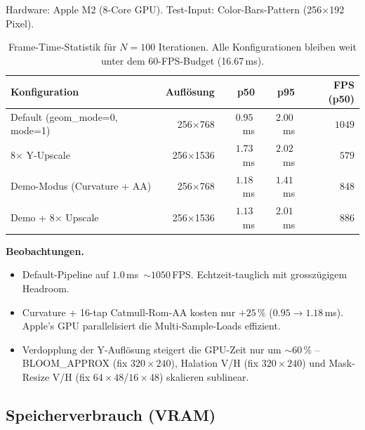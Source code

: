 \documentclass[11pt, a4paper]{article}
\newcommand{\tableheadercolor}{\rowcolor{hkared}}
\newcommand{\thw}[1]{\color{white}\textbf{#1}}  %
\begin{document}
Hardware: Apple M2 (8-Core GPU). Test-Input: Color-Bars-Pattern (256$\times$192 Pixel).

\vspace{.25cm}
\begin{table}[H]
\centering
\small
{}
\begin{tabularx}{\textwidth}{Xrrrr}
    \toprule
    \tableheadercolor \thw{Konfiguration} & \thw{Aufl\"osung} & \thw{p50} & \thw{p95} & \thw{FPS (p50)} \\
    \midrule
    Default (geom\_mode=0, mode=1)  & 256$\times$768   & $0.95$\,ms  & $2.00$\,ms & $1049$ \\
    8$\times$ Y-Upscale              & 256$\times$1536  & $1.73$\,ms  & $2.02$\,ms & $579$ \\
    Demo-Modus (Curvature + AA)      & 256$\times$768   & $1.18$\,ms  & $1.41$\,ms & $848$ \\
    Demo + 8$\times$ Upscale         & 256$\times$1536  & $1.13$\,ms  & $2.01$\,ms & $886$ \\
    \bottomrule
\end{tabularx}
 \vspace{.25cm}
\caption{Frame-Time-Statistik f\"ur $N = 100$ Iterationen. Alle Konfigurationen bleiben weit unter dem 60-FPS-Budget (16.67\,ms).}
\label{tab:bench}
\end{table}

\textbf{Beobachtungen.}
\begin{itemize}[leftmargin=*, nosep]
    \item Default-Pipeline auf $1.0\,$ms~$\sim 1050$\,FPS. Echtzeit-tauglich mit grossz\"ugigem Headroom.
    \item Curvature + 16-tap Catmull-Rom-AA kosten nur $+25\,\%$ ($0.95 \rightarrow 1.18$\,ms). Apple's GPU parallelisiert die Multi-Sample-Loads effizient.
    \item Verdopplung der Y-Aufl\"osung steigert die GPU-Zeit nur um $\sim 60\,\%$ -- BLOOM\_APPROX (fix $320 \times 240$), Halation V/H (fix $320 \times 240$) und Mask-Resize V/H (fix $64 \times 48$/$16 \times 48$) skalieren sublinear.
\end{itemize}

\vspace{.5cm}
\subsection{Speicherverbrauch (VRAM)}
\vspace{.25cm}
\end{document}
